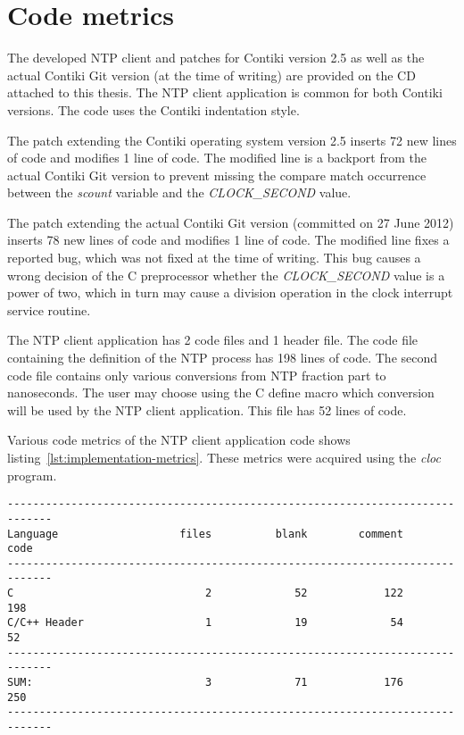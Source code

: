 
\section{Code metrics}
The developed NTP client and patches for Contiki version 2.5
as well as the actual Contiki Git version (at the time of writing)
are provided on the CD attached to this thesis.
The NTP client application is common for both Contiki versions.
The code uses the Contiki indentation style.

The patch extending the Contiki operating system version 2.5
inserts 72 new lines of code and modifies 1 line of code.
The modified line is a backport from the actual Contiki Git version to prevent
missing the compare match occurrence between the {\it{scount}} variable and
the {\it{CLOCK\_SECOND}} value.

The patch extending the actual Contiki Git version
(committed on 27 June 2012) 
inserts 78 new lines of code and modifies 1 line of code.
The modified line fixes a reported bug, which was not fixed at the time of writing.
This bug causes a wrong decision of the C preprocessor whether the {\it{CLOCK\_SECOND}}
value is a power of two, which in turn may cause a division operation in
the clock interrupt service routine.

The NTP client application has 2 code files and 1 header file.
The code file containing the definition of the NTP process
has 198 lines of code.
The second code file contains only various conversions from NTP fraction part
to nanoseconds.
The user may choose using the C define macro which conversion will be used
by the NTP client application.
This file has 52 lines of code.

Various code metrics of the NTP client application code
shows listing~\ref{lst:implementation-metrics}.
These metrics were acquired using the {\it{cloc}} program.
\begin{lstlisting}[caption={NTP client application code metrics},label={lst:implementation-metrics}]
-----------------------------------------------------------------------------
Language                   files          blank        comment           code
-----------------------------------------------------------------------------
C                              2             52            122            198
C/C++ Header                   1             19             54             52
-----------------------------------------------------------------------------
SUM:                           3             71            176            250
-----------------------------------------------------------------------------
\end{lstlisting}
